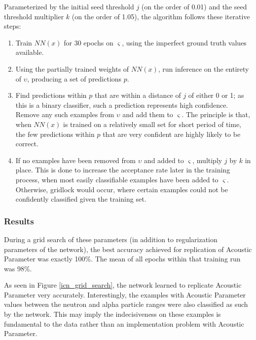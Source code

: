 \documentclass[10pt]{article}
\begin{document}
Parameterized by the initial seed threshold $j$ (on the order of 0.01) and the seed threshold multiplier $k$ (on the order of 1.05), the algorithm follows these iterative steps:

\begin{enumerate}
    \item Train $NN(x)$ for 30 epochs on $\varsigma$, using the imperfect ground truth values available.
    \item Using the partially trained weights of $NN(x)$, run inference on the entirety of $\upsilon$, producing a set of predictions $p$.
    \item Find predictions within $p$ that are within a distance of $j$ of either 0 or 1; as this is a binary classifier, such a prediction represents high confidence. Remove any such examples from $\upsilon$ and add them to $\varsigma$. The principle is that, when $NN(x)$ is trained on a relatively small set for short period of time, the few predictions within $p$ that are very confident are highly likely to be correct.
    \item If no examples have been removed from $\upsilon$ and added to $\varsigma$, multiply $j$ by $k$ in place. This is done to increase the acceptance rate later in the training process, when most easily classifiable examples have been added to $\varsigma$. Otherwise, gridlock would occur, where certain examples could not be confidently classified given the training set.
\end{enumerate}

\subsubsection{Results}

During a grid search of these parameters (in addition to regularization parameters of the network), the best accuracy achieved for replication of Acoustic Parameter was exactly 100\%. The mean of all epochs within that training run was 98\%.

As seen in Figure \ref{icn_grid_search}, the network learned to replicate Acoustic Parameter very accurately. Interestingly, the examples with Acoustic Parameter values between the neutron and alpha particle ranges were also classified as such by the network. This may imply the indecisiveness on these examples is fundamental to the data rather than an implementation problem with Acoustic Parameter.
\end{document}
